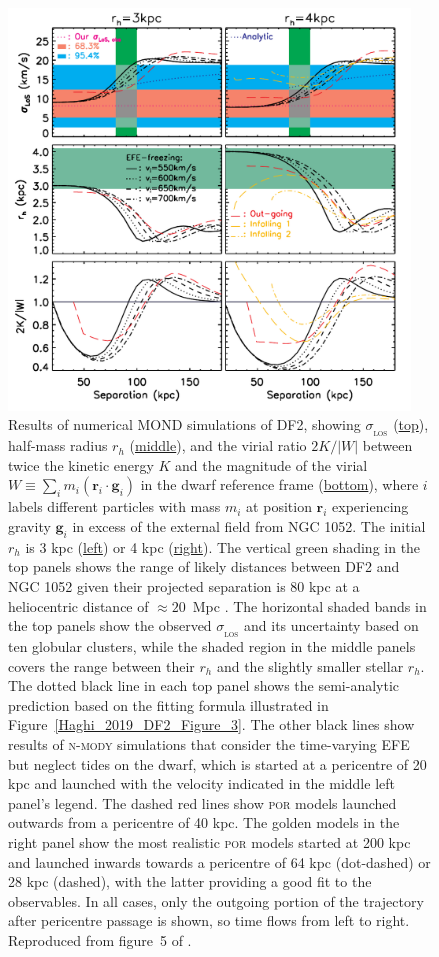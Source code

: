 \documentclass[fleqn,usenatbib,useAMS]{mnras} %
\begin{document}
\begin{figure}
	\centering
	\includegraphics[width=0.95\textwidth]{Haghi_2019_DF2_Figure_5}
	\caption{Results of numerical MOND simulations of DF2, showing $\sigma_{_\text{LOS}}$ (\underline{top}), half-mass radius $r_h$ (\underline{middle}), and the virial ratio $2K/\left|W\right|$ between twice the kinetic energy $K$ and the magnitude of the virial $W \equiv \sum_i m_i \left( \bm{r}_i \cdot \bm{g}_i \right)$ in the dwarf reference frame (\underline{bottom}), where $i$ labels different particles with mass $m_i$ at position $\bm{r}_i$ experiencing gravity $\bm{g}_i$ in excess of the external field from NGC 1052. The initial $r_h$ is 3 kpc (\underline{left}) or 4 kpc (\underline{right}). The vertical green shading in the top panels shows the range of likely distances between DF2 and NGC 1052 given their projected separation is 80 kpc at a heliocentric distance of $\approx 20$~Mpc \citep{Shen_2021}. The horizontal shaded bands in the top panels show the observed $\sigma_{_\text{LOS}}$ and its uncertainty based on ten globular clusters, while the shaded region in the middle panels covers the range between their $r_h$ and the slightly smaller stellar $r_h$. The dotted black line in each top panel shows the semi-analytic prediction based on the fitting formula illustrated in Figure~\ref{Haghi_2019_DF2_Figure_3}. The other black lines show results of \textsc{n-mody} simulations that consider the time-varying EFE but neglect tides on the dwarf, which is started at a pericentre of 20 kpc and launched with the velocity indicated in the middle left panel's legend. The dashed red lines show \textsc{por} models launched outwards from a pericentre of 40 kpc. The golden models in the right panel show the most realistic \textsc{por} models started at 200 kpc and launched inwards towards a pericentre of 64 kpc (dot-dashed) or 28 kpc (dashed), with the latter providing a good fit to the observables. In all cases, only the outgoing portion of the trajectory after pericentre passage is shown, so time flows from left to right. Reproduced from figure~5 of \citet{Haghi_2019_DF2}.}

\end{figure}
\end{document}
